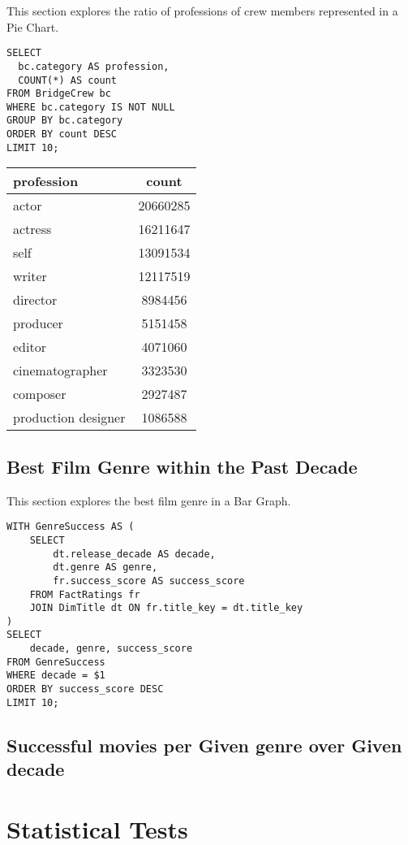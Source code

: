 \documentclass[sigconf, pbalance]{acmart}
\begin{document}
This section explores the ratio of professions of crew members represented in a Pie Chart.
\begin{lstlisting}[style=SQLStyle]
SELECT 
  bc.category AS profession,
  COUNT(*) AS count
FROM BridgeCrew bc
WHERE bc.category IS NOT NULL
GROUP BY bc.category
ORDER BY count DESC
LIMIT 10;
\end{lstlisting}

\begin{center}
\begin{tabular}{|p{4cm}|c|}
\hline
profession & count\\
\hline
actor & 20660285 \\
actress & 16211647 \\
self & 13091534 \\ 
writer & 12117519 \\
director & 8984456 \\
producer & 5151458 \\
editor & 4071060 \\
cinematographer & 3323530 \\
composer & 2927487 \\
production designer & 1086588 \\
\hline
\end{tabular}
\end{center}

\subsection{Best Film Genre within the Past Decade}

This section explores the best film genre in a Bar Graph.
\begin{lstlisting}[style=SQLStyle]
WITH GenreSuccess AS (
    SELECT
        dt.release_decade AS decade,
        dt.genre AS genre,
        fr.success_score AS success_score
    FROM FactRatings fr
    JOIN DimTitle dt ON fr.title_key = dt.title_key
)
SELECT
    decade, genre, success_score
FROM GenreSuccess
WHERE decade = $1
ORDER BY success_score DESC
LIMIT 10;
\end{lstlisting}

\subsection{Successful movies per Given genre over Given decade}

\section{Statistical Tests}
\end{document}
